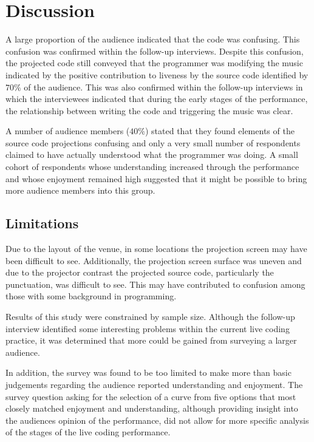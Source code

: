 \section{Discussion}

A large proportion of the audience indicated that the code was confusing. This confusion was confirmed within the follow-up interviews. Despite this confusion, the projected code still conveyed that the programmer was modifying the music indicated by the positive contribution to liveness by the source code identified by $70\%$ of the audience. This was also confirmed within the follow-up interviews in which the interviewees indicated that during the early stages of the performance, the relationship between writing the code and triggering the music was clear.

A number of audience members ($40\%$) stated that they found elements of the source code projections confusing and only a very small number of respondents claimed to have actually understood what the programmer was doing. A small cohort of respondents whose understanding increased through the performance and whose enjoyment remained high suggested that it might be possible to bring more audience members into this group.

\subsection{Limitations}

Due to the layout of the venue, in some locations the projection screen may have been difficult to see. Additionally, the projection screen surface was uneven and due to the projector contrast the projected source code, particularly the punctuation, was difficult to see. This may have contributed to confusion among those with some background in programming.

Results of this study were constrained by sample size. Although the follow-up interview identified some interesting problems within the current live coding practice, it was determined that more could be gained from surveying a larger audience.

In addition, the survey was found to be too limited to make more than basic judgements regarding the audience reported understanding and enjoyment. The survey question asking for the selection of a curve from five options that most closely matched enjoyment and understanding, although providing insight into the audiences opinion of the performance, did not allow for more specific analysis of the stages of the live coding performance.

